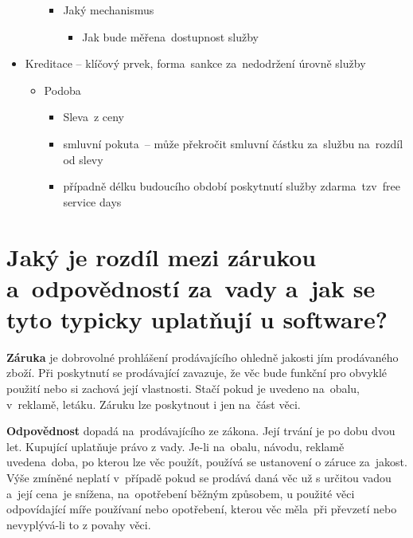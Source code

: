 \begin{itemize}[noitemsep]
\begin{itemize}[noitemsep]
\begin{itemize}[noitemsep]
                        \item Jaký mechanismus
                              \begin{itemize}[noitemsep]
                                  \item Jak bude měřena~dostupnost služby
                              \end{itemize}
                    \end{itemize}
          \end{itemize}
    \item Kreditace -- klíčový prvek, forma~sankce za~nedodržení úrovně služby
          \begin{itemize}[noitemsep]
              \item Podoba
                    \begin{itemize}[noitemsep]
                        \item  Sleva~z ceny
                        \item smluvní pokuta~-- může překročit smluvní částku za~službu na~rozdíl od slevy
                        \item případně délku budoucího období poskytnutí služby zdarma~tzv~free service days
                    \end{itemize}
          \end{itemize}
\end{itemize}


\newpage
\section{Jaký je rozdíl mezi zárukou a~odpovědností za~vady a~jak se tyto typicky uplatňují u software?}

\textbf{Záruka} je dobrovolné prohlášení prodávajícího ohledně jakosti jím prodávaného zboží. Při poskytnutí se prodávající zavazuje, že věc bude funkční pro obvyklé použití nebo si zachová její vlastnosti. Stačí pokud je uvedeno na~obalu, v~reklamě, letáku. Záruku lze poskytnout i jen na~část věci.

\textbf{Odpovědnost} dopadá na~prodávajícího ze zákona. Její trvání je po dobu dvou let. Kupující uplatňuje právo z vady. Je-li na~obalu, návodu, reklamě uvedena~doba, po kterou lze věc použít, používá se ustanovení o záruce za~jakost. Výše zmíněné neplatí v~případě pokud se prodává daná věc už s určitou vadou a~její cena~je snížena, na~opotřebení běžným způsobem, u použité věci odpovídající míře používaní nebo opotřebení, kterou věc měla~při převzetí nebo nevyplývá-li to z povahy věci.

